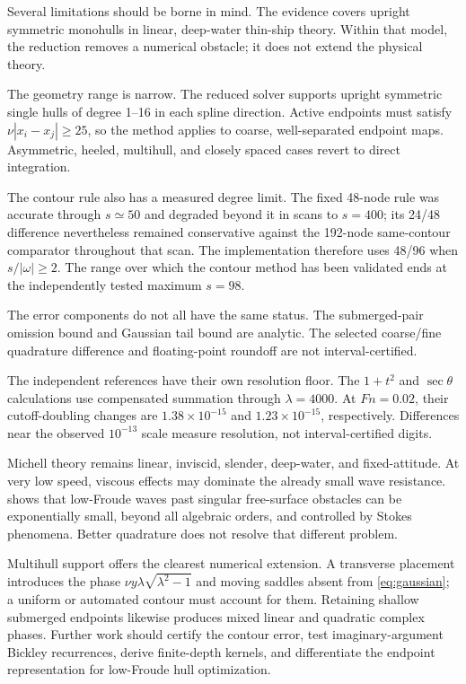 \documentclass[10pt]{article}
\newcommand{\Fn}{\mathit{Fn}}
\begin{document}
Several limitations should be borne in mind.  The evidence covers upright
symmetric monohulls in linear, deep-water thin-ship theory.  Within that model,
the reduction removes a numerical obstacle; it does not extend the physical
theory.

The geometry range is narrow.  The reduced solver supports upright symmetric
single hulls of degree 1--16 in each spline direction.  Active endpoints must
satisfy \(\nu|x_i-x_j|\geq25\), so the method applies to coarse,
well-separated endpoint maps.  Asymmetric, heeled, multihull, and closely
spaced cases revert to direct integration.

The contour rule also has a measured degree limit.  The fixed 48-node rule was
accurate through \(s\simeq50\) and degraded beyond it in scans to \(s=400\);
its 24/48 difference nevertheless remained conservative against the 192-node
same-contour comparator throughout that scan.  The implementation therefore
uses 48/96 when \(s/|\omega|\geq2\).  The range over which the contour method
has been validated ends at the independently tested maximum \(s=98\).

The error components do not all have the same status.  The submerged-pair
omission bound and Gaussian tail bound are analytic.  The selected coarse/fine
quadrature difference and floating-point roundoff are not interval-certified.

The independent references have their own resolution floor.  The \(1+t^2\)
and \(\sec\theta\) calculations use compensated summation through
\(\lambda=4000\).  At \(\Fn=0.02\), their cutoff-doubling changes are
\(1.38\times10^{-15}\) and \(1.23\times10^{-15}\), respectively.
Differences near the observed \(10^{-13}\) scale measure resolution, not
interval-certified digits.

Michell theory remains linear, inviscid, slender, deep-water, and
fixed-attitude.  At very low speed, viscous effects may dominate the already
small wave resistance.  \citet{TrinhChapman2015} shows that low-Froude waves
past singular free-surface obstacles can be exponentially small, beyond all
algebraic orders, and controlled by Stokes phenomena.  Better quadrature does
not resolve that different problem.

Multihull support offers the clearest numerical extension.  A transverse
placement introduces the phase \(\nu y\lambda\sqrt{\lambda^2-1}\) and moving
saddles absent from \cref{eq:gaussian}; a uniform or automated contour must
account for them.  Retaining shallow submerged endpoints likewise produces
mixed linear and quadratic complex phases.  Further work should certify the
contour error, test imaginary-argument Bickley recurrences, derive finite-depth
kernels, and differentiate the endpoint representation for low-Froude hull
optimization.
\end{document}
